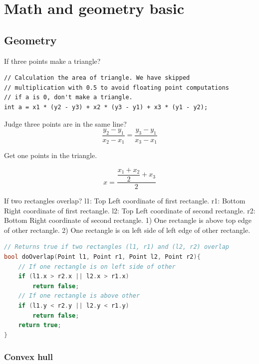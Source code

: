 \documentclass[a4paper,11pt,twoside]{book}
\begin{document}
\section{Math and geometry basic}
\subsection{Geometry}

	\par If three points make a triangle?
\begin{lstlisting}
// Calculation the area of triangle. We have skipped
// multiplication with 0.5 to avoid floating point computations
// if a is 0, don't make a triangle.
int a = x1 * (y2 - y3) + x2 * (y3 - y1) + x3 * (y1 - y2);
\end{lstlisting}

	\par Judge three points are in the same line?
\[
\dfrac{y_{2}-y_{1}}{x_{2}-x_{1}}  = \dfrac{y_{3}-y_{1}}{x_{3}-x_{1}}
\]

	\par Get one points in the triangle. 

\[
x = \dfrac{\dfrac{x_{1}+x_{2}}{2}+x_{3}}{2}
\]

\par If two rectangles overlap? l1: Top Left coordinate of first rectangle. r1: Bottom Right coordinate of first rectangle. l2: Top Left coordinate of second rectangle. r2: Bottom Right coordinate of second rectangle. 1) One rectangle is above top edge of other rectangle. 2) One rectangle is on left side of left edge of other rectangle.

\begin{lstlisting}[frame=single, language=c++]
// Returns true if two rectangles (l1, r1) and (l2, r2) overlap
bool doOverlap(Point l1, Point r1, Point l2, Point r2){
    // If one rectangle is on left side of other
    if (l1.x > r2.x || l2.x > r1.x)
        return false;
    // If one rectangle is above other
    if (l1.y < r2.y || l2.y < r1.y)
        return false;
    return true;
}
\end{lstlisting}


\subsubsection{Convex hull}
\end{document}
